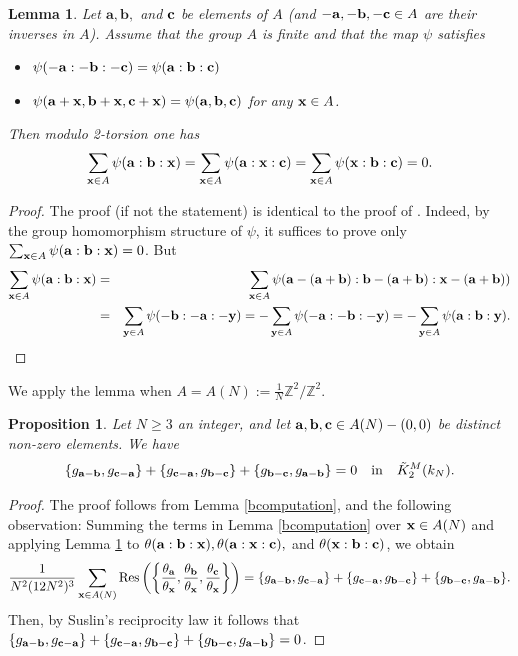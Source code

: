 \documentclass[12pt,amstex,amssymb]{article}
\theoremstyle{plain}
\newtheorem{proposition}[theorem]{Proposition}
\newtheorem{lemma}[theorem]{Lemma}
\theoremstyle{definition}
\newtheorem{remark}[theorem]{Remark}
\def\Z{{\mathbb Z}}
\def\bx {{\bf x}}
\def\by {{\bf y}}
\newcommand{\be}{\begin{eqnarray*}}
\newcommand{\ee}{\end{eqnarray*}}
\newcommand{\Res}{\operatorname{Res}}
\newcommand{\ba}{\mathbf{a}}
\newcommand{\bb}{\mathbf{b}}
\newcommand{\bc}{{\bf c}}
\begin{document}
\begin{lemma}\label{gonchvariantlemma}
Let $\ba,\bb,$ and $\bc$ be elements of $A$ (and $-\ba, -\bb,-\bc \in A$ are their inverses in $A$).
Assume that the group $A$ is finite and that the map $\psi$ satisfies
\begin{itemize}
	\item $\psi(-\ba:-\bb:-\bc)=\psi(\ba:\bb:\bc)$
	\item $\psi(\ba + \bx, \bb + \bx, \bc + \bx) = \psi(\ba , \bb , \bc )$ for any $\bx\in A$.
\end{itemize}
Then modulo 2-torsion one has \be
\sum_{\bx \in A} \psi(\ba:\bb:\bx)=\sum_{\bx \in A}\psi(\ba:\bx:\bc)=\sum_{\bx \in A}\psi(\bx:\bb:\bc) =0.
\ee
\end{lemma}
\begin{proof}
The proof (if not the statement) is identical to the proof of \cite[Lemma 2.11]{Gon}.  Indeed, by the group homomorphism structure of $\psi$, it suffices to prove only 
$\sum_{\bx \in A} \psi(\ba:\bb:\bx)=0$.  But 
\be
\sum_{\bx \in A} \psi(\ba:\bb:\bx)
&=&\sum_{\bx \in A}\psi(\ba-(\ba+\bb):\bb-(\ba+\bb):\bx-(\ba+\bb))\\
&=&\sum_{\by \in A}\psi(-\bb:-\ba:-\by)=-\sum_{\by \in A}\psi(-\ba:-\bb:-\by)=-\sum_{\by \in A}\psi(\ba:\bb:\by).
\ee
\end{proof}
We apply the lemma when $A=A(N):= \frac{1}{N}\Z^2/\Z^2$.
\begin{proposition}\label{klem}
	Let $N\ge 3$ an integer, and let $\ba,\bb,\bc \in A(N)-(0,0)$ be distinct non-zero elements. We have
	\be
	\{g_{\ba-\bb},g_{\bc-\ba}\} +  \{g_{\bc-\ba},g_{\bb-\bc}\} +  \{g_{\bb-\bc},g_{\ba-\bb}\} =0 \quad \text{in} \quad \tilde K^M_2(k_N).
	\ee
\end{proposition}

\begin{proof}  
	The proof follows from Lemma \ref{bcomputation}, and the following observation:
	Summing the terms in Lemma \ref{bcomputation} over $\bx \in A(N)$ and applying Lemma \ref{gonchvariantlemma} 
	to $\theta(\ba:\bb:\bx), \theta(\ba:\bx:\bc),$ and $\theta(\bx:\bb:\bc)$, we obtain
	$$
	\frac{1}{N^2(12N^2)^3} \sum_{\bx \in A(N)} {\Res}\left( \left\{\frac{\theta_{\ba}}{\theta_\bx},\frac{\theta_{\bb}}{\theta_\bx},\frac{\theta_{\bc}}{\theta_\bx}\right\}\right)=\{g_{\ba-\bb},g_{\bc-\ba}\} +  \{g_{\bc-\ba},g_{\bb-\bc}\} +  \{g_{\bb-\bc},g_{\ba-\bb}\}.
	$$
	Then, by Suslin's reciprocity law it follows that $\{g_{\ba-\bb},g_{\bc-\ba}\} +  \{g_{\bc-\ba},g_{\bb-\bc}\} +  \{g_{\bb-\bc},g_{\ba-\bb}\}= 0$.




\end{proof}
\end{document}
